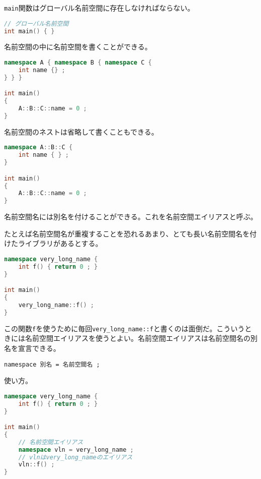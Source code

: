 \texttt{main}関数はグローバル名前空間に存在しなければならない。

\begin{lstlisting}[language={C++}]
// グローバル名前空間
int main() { }
\end{lstlisting}


名前空間の中に名前空間を書くことができる。

\begin{lstlisting}[language={C++}]
namespace A { namespace B { namespace C {
    int name {} ;
} } }

int main()
{
    A::B::C::name = 0 ;
}
\end{lstlisting}

名前空間のネストは省略して書くこともできる。

\begin{lstlisting}[language={C++}]
namespace A::B::C {
    int name { } ;
}

int main()
{
    A::B::C::name = 0 ;
}
\end{lstlisting}


名前空間名には別名を付けることができる。これを名前空間エイリアスと呼ぶ。

たとえば名前空間名が重複することを恐れるあまり、とても長い名前空間名を付けたライブラリがあるとする。

\begin{lstlisting}[language={C++}]
namespace very_long_name {
    int f() { return 0 ; }
}

int main()
{
    very_long_name::f() ;
}
\end{lstlisting}

この関数\texttt{f}を使うために毎回\texttt{very\_long\_name::f}と書くのは面倒だ。こういうときには名前空間エイリアスを使うとよい。名前空間エイリアスは名前空間名の別名を宣言できる。

\begin{lstlisting}[style=grammar]
namespace 別名 = 名前空間名 ;
\end{lstlisting}

使い方。

\begin{lstlisting}[language={C++}]
namespace very_long_name {
    int f() { return 0 ; }
}

int main()
{
    // 名前空間エイリアス
    namespace vln = very_long_name ;
    // vlnはvery_long_nameのエイリアス
    vln::f() ;
}
\end{lstlisting}

